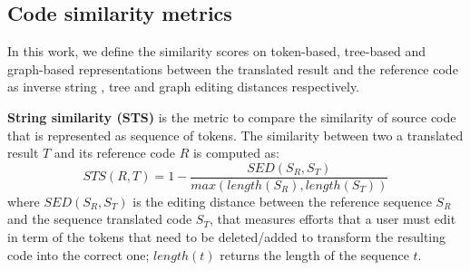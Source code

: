 \subsection{Code similarity metrics}
In this work, we define the similarity scores on token-based, tree-based 
and graph-based representations between the translated result and the 
reference code as inverse string \cite{??} , tree \cite{??} and graph 
\cite{??} editing distances respectively.

\textbf{String similarity (STS)} is the metric to compare the similarity of 
source code that is represented as sequence of tokens. The similarity between 
two a translated result $T$ and its reference code $R$ is computed as: 
$$STS(R, T) = 1 - \frac{SED(S_R, S_T)}{max\left(length(S_R), length(S_T)\right)}$$
where $SED(S_R, S_T)$ is the editing distance between the 
reference sequence $S_R$ and the sequence translated code $S_T$, that 
measures efforts that a user must edit in term of the tokens that need 
to be deleted/added to transform the resulting code into the correct one;  
$length(t)$ returns the length of the sequence $t$.



